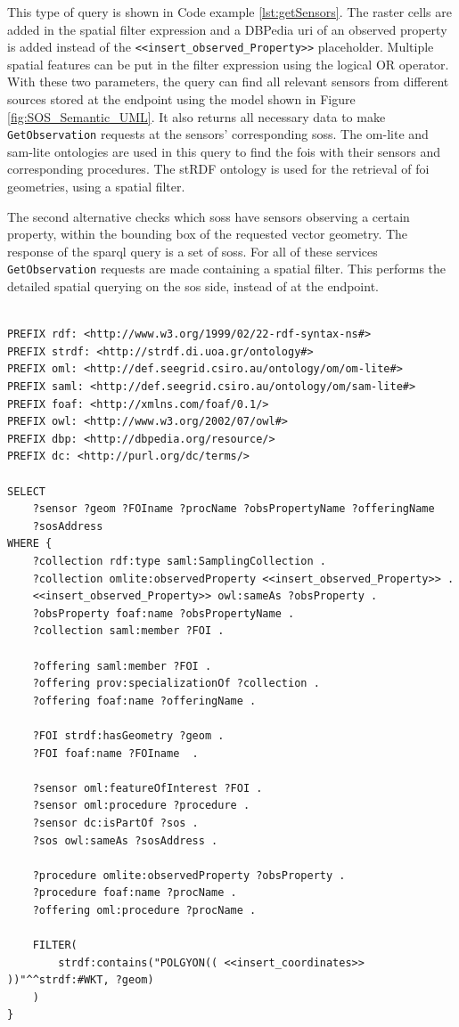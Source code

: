 This type of query is shown in Code example \ref{lst:getSensors}. The raster cells are added in the spatial filter expression and a DBPedia \ac{uri} of an observed property is added instead of the \texttt{<<insert\_observed\_Property>>} placeholder. Multiple spatial features can be put in the filter expression using the logical OR operator. With these two parameters, the query can find all relevant sensors from different sources stored at the endpoint using the model shown in Figure \ref{fig:SOS_Semantic_UML}. It also returns all necessary data to make \texttt{GetObservation} requests at the sensors' corresponding \aclp{sos}. The om-lite and sam-lite ontologies are used in this query to find the \acp{foi} with their sensors and corresponding procedures. The stRDF ontology is used for the retrieval of \ac{foi} geometries, using a spatial filter.  

The second alternative checks which \aclp{sos} have sensors observing a certain property, within the bounding box of the requested vector geometry. The response of the \ac{sparql} query is a set of \aclp{sos}. For all of these services \texttt{GetObservation} requests are made containing a spatial filter. This performs the detailed spatial querying on the \ac{sos} side, instead of at the endpoint. 

\begin{lstlisting}[float,caption={A spatial SPARQL query for discovering sensors and their SOS related metadata}, label={lst:getSensors}]

PREFIX rdf: <http://www.w3.org/1999/02/22-rdf-syntax-ns#>
PREFIX strdf: <http://strdf.di.uoa.gr/ontology#>
PREFIX oml: <http://def.seegrid.csiro.au/ontology/om/om-lite#>
PREFIX saml: <http://def.seegrid.csiro.au/ontology/om/sam-lite#>
PREFIX foaf: <http://xmlns.com/foaf/0.1/>
PREFIX owl: <http://www.w3.org/2002/07/owl#>
PREFIX dbp: <http://dbpedia.org/resource/>
PREFIX dc: <http://purl.org/dc/terms/>

SELECT 
	?sensor ?geom ?FOIname ?procName ?obsPropertyName ?offeringName 
	?sosAddress
WHERE {
	?collection rdf:type saml:SamplingCollection .
	?collection omlite:observedProperty <<insert_observed_Property>> .
	<<insert_observed_Property>> owl:sameAs ?obsProperty .
	?obsProperty foaf:name ?obsPropertyName .
	?collection saml:member ?FOI .
	
	?offering saml:member ?FOI . 
	?offering prov:specializationOf ?collection .
	?offering foaf:name ?offeringName .
	
	?FOI strdf:hasGeometry ?geom . 
	?FOI foaf:name ?FOIname  .
	
	?sensor oml:featureOfInterest ?FOI .
	?sensor oml:procedure ?procedure .
	?sensor dc:isPartOf ?sos .
	?sos owl:sameAs ?sosAddress .
	
	?procedure omlite:observedProperty ?obsProperty .
	?procedure foaf:name ?procName .
	?offering oml:procedure ?procName .
	
	FILTER(
		strdf:contains("POLGYON(( <<insert_coordinates>> ))"^^strdf:#WKT, ?geom)
	)		
}
\end{lstlisting}


